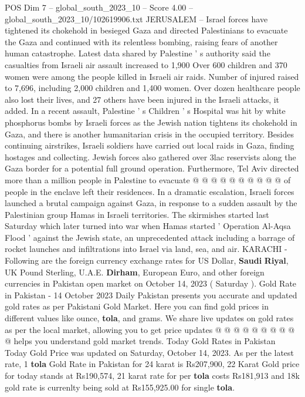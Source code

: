 \begin{textsample}{POS Dim 7 – global\_south\_2023\_10 – Score 4.00 – global\_south\_2023\_10/102619906.txt}  \label{ex:f7_pos_139}
JERUSALEM -- Israel forces have tightened its chokehold in besieged Gaza and directed Palestinians to evacuate the Gaza and continued with its relentless bombing, raising fears of another human catastrophe.
Latest data shared by Palestine ' s authority said the casualties from Israeli air assault increased to 1,900 Over 600 children and 370 women were among the people killed in Israeli air raids.
Number of injured raised to 7,696, including 2,000 children and 1,400 women.
Over dozen healthcare people also lost their lives, and 27 others have been injured in the Israeli attacks, it added.
In a recent assault, Palestine ' s Children ' s Hospital was hit by white phosphorus bombs by Israeli forces as the Jewish nation tightens its chokehold in Gaza, and there is another humanitarian crisis in the occupied territory.
Besides continuing airstrikes, Israeli soldiers have carried out local raids in Gaza, finding hostages and collecting.
Jewish forces also gathered over 3lac reservists along the Gaza border for a potential full ground operation.
Furthermore, Tel Aviv directed more than a million people in Palestine to evacuate @ @ @ @ @ @ @ @ @ @ of people in the enclave left their residences.
In a dramatic escalation, Israeli forces launched a brutal campaign against Gaza, in response to a sudden assault by the Palestinian group Hamas in Israeli territories.
The skirmishes started last Saturday which later turned into war when Hamas started ' Operation Al-Aqsa Flood ' against the Jewish state, an unprecedented attack including a barrage of rocket launches and infiltrations into Israel via land, sea, and air.
KARACHI - Following are the foreign currency exchange rates for US Dollar, \textbf{Saudi} \textbf{Riyal}, UK Pound Sterling, U.A.E. \textbf{Dirham}, European Euro, and other foreign currencies in Pakistan open market on October 14, 2023 ( Saturday ).
Gold Rate in Pakistan - 14 October 2023 Daily Pakistan presents you accurate and updated gold rates as per Pakistani Gold Market.
Here you can find gold prices in different values like ounce, \textbf{tola}, and grams.
We share live updates on gold rates as per the local market, allowing you to get price updates @ @ @ @ @ @ @ @ @ @ helps you understand gold market trends.
Today Gold Rates in Pakistan Today Gold Price was updated on Saturday, October 14, 2023.
As per the latest rate, 1 \textbf{tola} Gold Rate in Pakistan for 24 karat is Rs207,900, 22 Karat Gold price for today stands at Rs190,574, 21 karat rate for per \textbf{tola} costs Rs181,913 and 18k gold rate is currenlty being sold at Rs155,925.00 for single \textbf{tola}.

\end{textsample}
